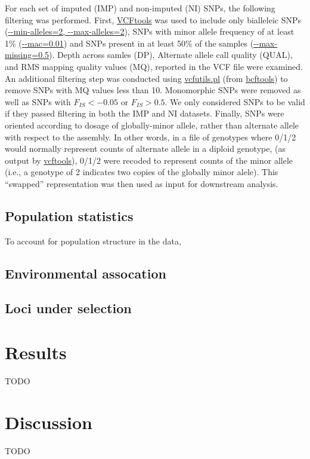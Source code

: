 \documentclass[fleqn,11pt]{wlpeerj}
\begin{document}
For each set of imputed (IMP) and non-imputed (NI) SNPs, the following filtering
was performed.  First, \url{VCFtools} was used to include only bialleleic
SNPs (\url{--min-alleles=2, --max-alleles=2}), SNPs with minor allele frequency
of at least 1\% (\url{--mac=0.01}) and SNPs present in at least 50\% of the
samples (\url{--max-missing=0.5}).  Depth across samles (DP), Alternate
allele call quality (QUAL), and RMS mapping quality values (MQ), reported in the
VCF file were examined.  An additional filtering step was conducted using
\url{vcfutils.pl} (from \url{bcftools}) to remove SNPs with MQ values less
than 10.  Monomorphic SNPs were removed as well as SNPs with
$F_{IS} < -0.05$ or $F_{IS} > 0.5$.  We only considered SNPs to be
valid if they passed filtering in both the IMP and NI datasets. Finally, SNPs
were oriented according to dosage of globally-minor allele, rather than
alternate allele with respect to the assembly. In other words, in a file of
genotypes where 0/1/2 would normally represent counts of alternate allele in a
diploid genotype,  (as output by \url{vcftools}), 0/1/2 were recoded to
represent counts of the minor allele (i.e., a genotype of 2 indicates two copies
of the globally minor alele). This ``swapped'' representation was then used as
input for downstream analysis.


\subsection*{Population statistics}
To account for population structure in the data,


\subsection*{Environmental assocation}

\subsection*{Loci under selection}


\subsection*{}

\section*{Results}
TODO


\section*{Discussion}
TODO
\end{document}
